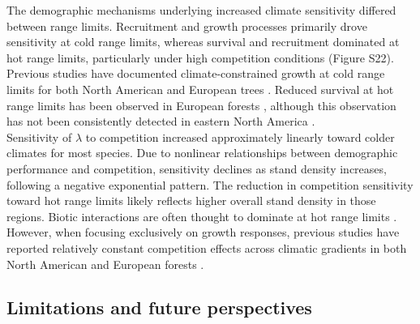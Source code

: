 The demographic mechanisms underlying increased climate sensitivity
differed between range limits. Recruitment and growth processes
primarily drove sensitivity at cold range limits, whereas survival and
recruitment dominated at hot range limits, particularly under high
competition conditions (Figure S22). Previous studies have documented
climate-constrained growth at cold range limits for both North American
\citep{Ettinger2013} and European trees \citep{Kunstler2021}. Reduced
survival at hot range limits has been observed in European forests
\citep{Kunstler2021}, although this observation has not been
consistently detected in eastern North America \citep{Purves2009}.\\

Sensitivity of \(\lambda\) to competition increased approximately
linearly toward colder climates for most species. Due to nonlinear
relationships between demographic performance and competition,
sensitivity declines as stand density increases, following a negative
exponential pattern. The reduction in competition sensitivity toward hot
range limits likely reflects higher overall stand density in those
regions. Biotic interactions are often thought to dominate at hot range
limits \citep{Paquette2021}. However, when focusing exclusively on
growth responses, previous studies have reported relatively constant
competition effects across climatic gradients in both North American
\citep{Ettinger2013} and European forests \citep{Kunstler2011a}.\\

\hypertarget{limitations-and-future-perspectives}{%
\subsection{Limitations and future
perspectives}\label{limitations-and-future-perspectives}}

